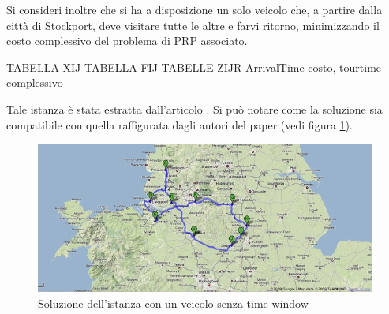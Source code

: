 		Si consideri inoltre che si ha a disposizione un solo veicolo che, a partire dalla città di  Stockport, deve visitare tutte le altre e farvi ritorno, minimizzando il costo complessivo del problema di PRP associato.

		TABELLA XIJ
		TABELLA FIJ
		TABELLE ZIJR
		ArrivalTime
		costo, tourtime complessivo

		Tale istanza è stata estratta dall’articolo \cite{Laporte11}. Si può notare come la soluzione sia compatibile con quella raffigurata dagli autori del paper (vedi figura \ref{fig:map_laporte}). 

		\begin{figure}[H]
			\centering
			\includegraphics[keepaspectratio=true]{img/map_solution_laporte.jpg}
			\caption{Soluzione dell'istanza con un veicolo senza time window}
			\label{fig:map_laporte}
		\end{figure}


